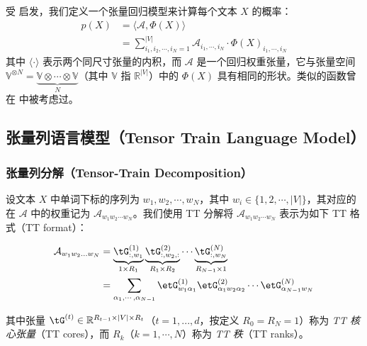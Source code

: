 \documentclass{article}
\theoremstyle{plain}
\theoremstyle{definition}
\theoremstyle{remark}
\begin{document}
受 \cite{zhang2019generalized, kossaifi2020tensor} 启发，我们定义一个张量回归模型来计算每个文本 $X$ 的概率：
%
\begin{align}
    \label{eq: general definition}
    p(X)
    &= \langle\mathcal{A}, \Phi(X)\rangle \nonumber \\
    &= \sum_{i_1,i_2,\cdots,i_N = 1}^{|V|} \mathcal{A}_{i_1,\cdots, i_N} \cdot \Phi(X)_{i_1,\cdots, i_N}
\end{align}
%
其中 $\langle \cdot \rangle$ 表示两个同尺寸张量的内积，而 $\mathcal{A}$ 是一个回归权重张量，它与张量空间 $\mathbb{V}^{\otimes N} = \underbrace{\mathbb{V} \otimes \cdots \otimes \mathbb{V}}_N $（其中 $\mathbb{V}$ 指 $\mathbb{R}^{|V|}$）中的 $\Phi(X)$ 具有相同的形状。类似的函数曾在 \cite{novikov2016exponential, NIPS2016_6211, khrulkov2018expressive, zhang2019generalized} 中被考虑过。


\subsection{张量列语言模型（Tensor Train Language Model）}
\label{sec: TTLM}
\subsubsection{张量列分解（Tensor-Train Decomposition）}
设文本 $X$ 中单词下标的序列为 $w_1, w_2, \cdots, w_N$，其中 $w_i \in \{1, 2, \cdots, |V|\}$，其对应的在 $\mathcal{A}$ 中的权重记为 $\mathcal{A}_{w_1 w_2\cdots w_N}$。我们使用 TT 分解将 $\mathcal{A}_{w_1 w_2\cdots w_N}$ 表示为如下 TT 格式（TT format）\citep{oseledets2011tensor}：


\begin{align}
    \label{eq: TT_index}
    \mathcal{A}_{w_1w_2...w_N}
    & = \underbrace{\tG^{(1)}_{:, w_1}}_{1\times R_1} \underbrace{\tG^{(2)}_{:, w_2, :}}_{R_1 \times R_2} \cdots \underbrace{\tG^{(N)}_{:, w_N}}_{R_{N-1} \times 1}  \\
    &= \sum_{\alpha_1, \cdots, \alpha_{N-1}}   \etG^{(1)}_{w_1\alpha_1} \etG^{(2)}_{\alpha_1w_2\alpha_2} \cdots \etG^{(N)}_{\alpha_{N-1}w_N}  \nonumber
\end{align}

其中张量 $\tG^{(t)} \in \mathbb{R}^{R_{t-1} \times |V| \times R_t}$（$t =1,...,d$，按定义 $R_0 = R_N = 1$）称为 \textit{TT 核心张量}（TT cores），而 $R_k$（$k = 1,\cdots,N$）称为 \textit{TT 秩}（TT ranks）。
\end{document}
